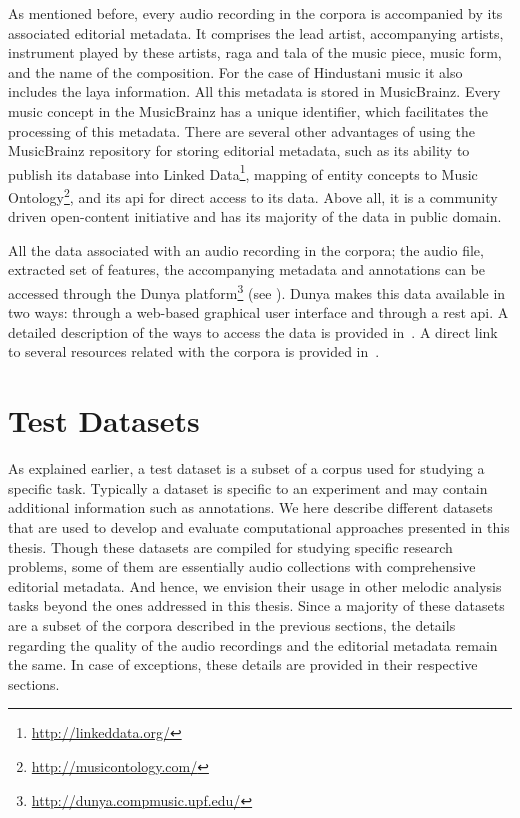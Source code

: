 As mentioned before, every audio recording in the corpora is accompanied by its associated editorial metadata. It comprises the lead artist, accompanying artists, instrument played by these artists, \gls{raga} and \gls{tala} of the music piece, music form, and the name of the composition. For the case of Hindustani music it also includes the \gls{laya} information. All this metadata is stored in MusicBrainz. Every music concept in the MusicBrainz has a unique identifier, which facilitates the processing of this metadata. There are several other advantages of using the MusicBrainz repository for storing editorial metadata, such as its ability to publish its database into Linked Data\footnote{\url{http://linkeddata.org/}}, mapping of entity concepts to Music Ontology\footnote{\url{http://musicontology.com/}}, and its \acrshort{api} for direct access to its data. Above all, it is a community driven open-content initiative and has its majority of the data in public domain.

All the data associated with an audio recording in the corpora; the audio file, extracted set of features, the accompanying metadata and annotations can be accessed through the Dunya platform\footnote{\url{http://dunya.compmusic.upf.edu/}} (see ). Dunya makes this data available in two ways: through a web-based graphical user interface and through a \acrshort{rest} \acrshort{api}. A detailed description of the ways to access the data is provided in~. A direct link to several resources related with the corpora is provided in~.


\section{Test Datasets}
\label{sec:corpus_test_datasets}

As explained earlier, a test dataset is a subset of a corpus used for studying a specific task. Typically a dataset is specific to an experiment and may contain additional information such as annotations. We here describe different datasets that are used to develop and evaluate computational approaches presented in this thesis. Though these datasets are compiled for studying specific research problems, some of them are essentially audio collections with comprehensive editorial metadata. And hence, we envision their usage in other melodic analysis tasks beyond the ones addressed in this thesis. Since a majority of these datasets are a subset of the corpora described in the previous sections, the details regarding the quality of the audio recordings and the editorial metadata remain the same. In case of exceptions, these details are provided in their respective sections. 


